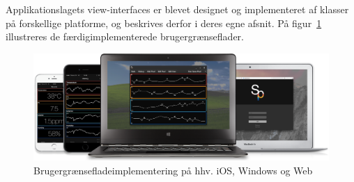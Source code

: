 Applikationslagets view-interfaces er blevet designet og implementeret af klasser på forskellige platforme, og beskrives derfor i deres egne afsnit. På figur~\ref{fig:view_family} illustreres de færdigimplementerede brugergrænseflader. 

\begin{figure}
	\centering
	\includegraphics[width=1.0\linewidth]{figs/implementering/view_family}
	\caption{Brugergrænsefladeimplementering på hhv. iOS, Windows og Web}
	\label{fig:view_family}
\end{figure}